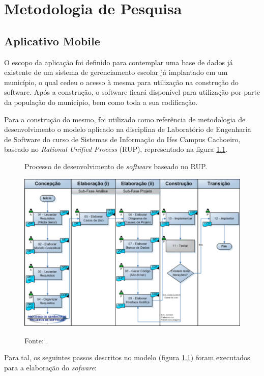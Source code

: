 \chapter{\textbf{Metodologia de Pesquisa}} %
\sloppy %

\section{Aplicativo Mobile}

O escopo da aplicação foi definido para contemplar uma base de dados já existente de um sistema de gerenciamento escolar já implantado em um município, o qual cedeu o acesso à mesma para utilização na construção do software. Após a construção, o software ficará disponível para utilização por parte da população do município, bem como toda a sua codificação.

Para a construção do mesmo, foi utilizado como referência de metodologia de desenvolvimento o modelo aplicado na disciplina de Laboratório de Engenharia de Software do curso de Sistemas de Informação do Ifes Campus Cachoeiro, baseado no \textit{Rational Unified Process} (RUP), representado na figura \ref{figura:rup}. 

\begin{figure}[H]
	\caption{Processo de desenvolvimento de \textit{software} baseado no RUP.}
	\centering %
	\includegraphics[width=16cm]{resources/pds_rup.png} %
	\label{figura:rup}
	\caption*{Fonte: .}
\end{figure}

Para tal, os seguintes passos descritos no modelo (figura \ref{figura:rup}) foram executados para a elaboração do \textit{sofware}:

